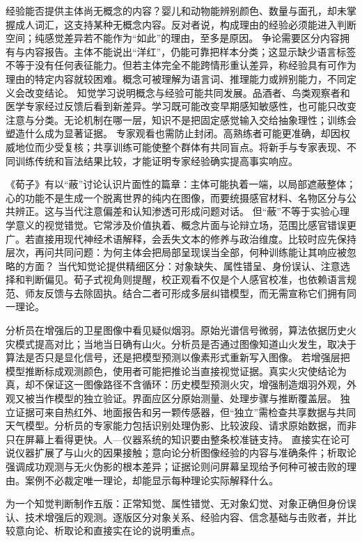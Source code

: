 经验能否提供主体尚无概念的内容？婴儿和动物能辨别颜色、数量与面孔，却未掌握成人词汇，这支持某种无概念内容。反对者说，构成理由的经验必须能进入判断空间；纯感觉差异若不能作为“如此”的理由，至多是原因。 争论需要区分内容拥有与内容报告。主体不能说出“洋红”，仍能可靠把样本分类；这显示缺少语言标签不等于没有任何表征能力。但若主体完全不能跨情形重认差异，称经验具有可作为理由的特定内容就较困难。概念可被理解为语言词、推理能力或辨别能力，不同定义会改变结论。 知觉学习说明概念与经验可能共同发展。品酒者、鸟类观察者和医学专家经过反馈后看到新差异。学习既可能改变早期感知敏感性，也可能只改变注意与分类。无论机制在哪一层，知识不是把固定感觉输入交给抽象理性；训练会塑造什么成为显著证据。 专家观看也需防止封闭。高熟练者可能更准确，却因权威地位而少受复核；共享训练可能使整个群体有共同盲点。将新手与专家表现、不同训练传统和盲法结果比较，才能证明专家经验确实提高事实响应。

《荀子》有以“蔽”讨论认识片面性的篇章：主体可能执着一端，以局部遮蔽整体；心的功能不是生成一个脱离世界的纯内在图像，而要统摄感官材料、名物区分与公共辨正\parencite{xunzi2014}。这与当代注意偏差和认知渗透可形成问题对话。 但“蔽”不等于实验心理学意义的视觉错觉。它常涉及价值执着、概念片面与论辩立场，范围比感官错误更广。若直接用现代神经术语解释，会丢失文本的修养与政治维度。比较时应先保持层次，再问共同问题：为何主体会把局部呈现误当全部，何种训练能让其响应被忽略的方面？ 当代知觉论提供精细区分：对象缺失、属性错呈、身份误认、注意选择和判断偏见。荀子式视角则提醒，校正观看不仅是个人感官校准，也依赖语言规范、师友反馈与去除固执。结合二者可形成多层纠错模型，而无需宣称它们拥有同一理论。

分析员在增强后的卫星图像中看见疑似烟羽。原始光谱信号微弱，算法依据历史火灾模式提高对比；当地当日确有山火。分析员是否通过图像知道山火发生，取决于算法是否只是显化信号，还是把模型预测以像素形式重新写入图像。 若增强层把模型推断标成观测颜色，使用者可能把推论当直接视觉证据。真实火灾使结论为真，却不保证这一图像路径不含循环：历史模型预测火灾，增强制造烟羽外观，外观又被当作模型的独立验证。界面应区分原始测量、处理步骤与推断覆盖层。 独立证据可来自热红外、地面报告和另一颗传感器，但“独立”需检查共享数据与共同天气模型。分析员的专家能力包括识别处理伪影、比较波段、请求原始数据，而非只在屏幕上看得更快。人—仪器系统的知识要由整条校准链支持。 直接实在论可说仪器扩展了与山火的因果接触；意向论分析图像经验的内容与准确条件；析取论强调成功观测与无火伪影的根本差异；证据论则问屏幕呈现给予何种可被击败的理由。案例不必裁定唯一理论，却能显示每种理论实际解释什么。

\begin{tcolorbox}[breakable,colback=white,colframe=blue!30!black,title={本章研读任务},fonttitle=\bfseries]
为一个知觉判断制作五版：正常知觉、属性错觉、无对象幻觉、对象正确但身份误认、技术增强后的观测。逐版区分对象关系、经验内容、信念基础与击败者，并比较意向论、析取论和直接实在论的说明重点。
\end{tcolorbox}
